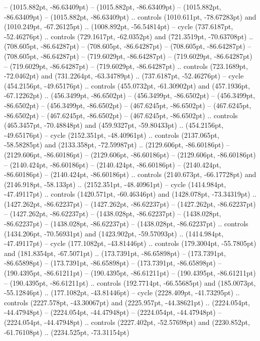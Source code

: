  -- (1015.882pt, -86.63409pt)
 -- (1015.882pt, -86.63409pt)
 -- (1015.882pt, -86.63409pt)
 -- (1015.882pt, -86.63409pt) .. controls (1010.611pt, -78.67283pt) and (1010.249pt, -67.26125pt) .. (1008.892pt, -56.54814pt) -- cycle
(737.6187pt, -52.46276pt) .. controls (729.1617pt, -62.0352pt) and (721.3519pt, -70.63708pt) .. (708.605pt, -86.64287pt)
 -- (708.605pt, -86.64287pt)
 -- (708.605pt, -86.64287pt)
 -- (708.605pt, -86.64287pt)
 -- (719.6029pt, -86.64287pt)
 -- (719.6029pt, -86.64287pt)
 -- (719.6029pt, -86.64287pt)
 -- (719.6029pt, -86.64287pt) .. controls (723.1689pt, -72.0462pt) and (731.2264pt, -63.34789pt) .. (737.6187pt, -52.46276pt) -- cycle
(454.2156pt, -49.65176pt) .. controls (455.0732pt, -61.30902pt) and (457.1936pt, -67.12262pt) .. (456.3499pt, -86.6502pt)
 -- (456.3499pt, -86.6502pt)
 -- (456.3499pt, -86.6502pt)
 -- (456.3499pt, -86.6502pt)
 -- (467.6245pt, -86.6502pt)
 -- (467.6245pt, -86.6502pt)
 -- (467.6245pt, -86.6502pt)
 -- (467.6245pt, -86.6502pt) .. controls (465.3457pt, -70.48848pt) and (459.9327pt, -59.80433pt) .. (454.2156pt, -49.65176pt) -- cycle
(2152.351pt, -48.40961pt) .. controls (2137.065pt, -58.58285pt) and (2133.358pt, -72.59987pt) .. (2129.606pt, -86.60186pt)
 -- (2129.606pt, -86.60186pt)
 -- (2129.606pt, -86.60186pt)
 -- (2129.606pt, -86.60186pt)
 -- (2140.424pt, -86.60186pt)
 -- (2140.424pt, -86.60186pt)
 -- (2140.424pt, -86.60186pt)
 -- (2140.424pt, -86.60186pt) .. controls (2140.673pt, -66.17728pt) and (2146.918pt, -58.133pt) .. (2152.351pt, -48.40961pt) -- cycle
(1414.984pt, -47.49117pt) .. controls (1420.571pt, -60.46346pt) and (1428.078pt, -73.34319pt) .. (1427.262pt, -86.62237pt)
 -- (1427.262pt, -86.62237pt)
 -- (1427.262pt, -86.62237pt)
 -- (1427.262pt, -86.62237pt)
 -- (1438.028pt, -86.62237pt)
 -- (1438.028pt, -86.62237pt)
 -- (1438.028pt, -86.62237pt)
 -- (1438.028pt, -86.62237pt) .. controls (1434.206pt, -70.56931pt) and (1423.902pt, -59.57093pt) .. (1414.984pt, -47.49117pt) -- cycle
(177.1082pt, -43.81446pt) .. controls (179.3004pt, -55.7805pt) and (181.8354pt, -67.5071pt) .. (173.7391pt, -86.65898pt)
 -- (173.7391pt, -86.65898pt)
 -- (173.7391pt, -86.65898pt)
 -- (173.7391pt, -86.65898pt)
 -- (190.4395pt, -86.61211pt)
 -- (190.4395pt, -86.61211pt)
 -- (190.4395pt, -86.61211pt)
 -- (190.4395pt, -86.61211pt) .. controls (192.7714pt, -66.55685pt) and (185.0073pt, -55.12846pt) .. (177.1082pt, -43.81446pt) -- cycle
(2228.409pt, -41.73295pt) .. controls (2227.578pt, -43.30067pt) and (2225.957pt, -44.38621pt) .. (2224.054pt, -44.47948pt)
 -- (2224.054pt, -44.47948pt)
 -- (2224.054pt, -44.47948pt)
 -- (2224.054pt, -44.47948pt) .. controls (2227.402pt, -52.57698pt) and (2230.852pt, -61.76108pt) .. (2234.525pt, -73.31154pt)
